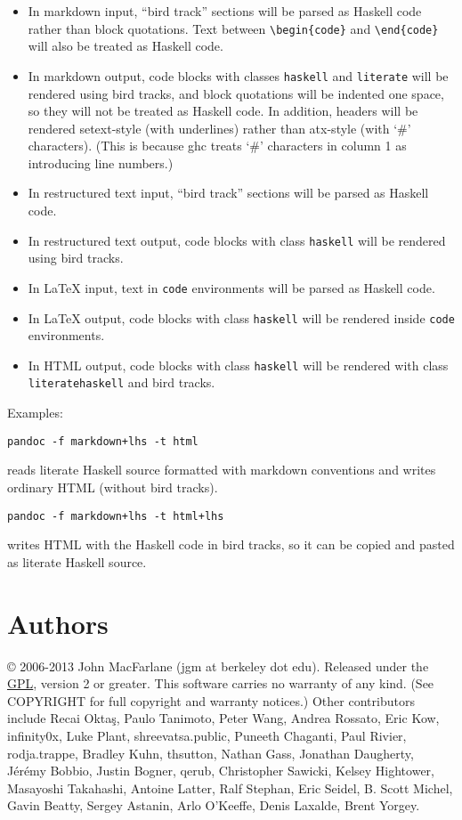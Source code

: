 \documentclass[]{article}
\begin{document}
\begin{itemize}
\item
  In markdown input, ``bird track'' sections will be parsed as Haskell
  code rather than block quotations. Text between
  \texttt{\textbackslash{}begin\{code\}} and
  \texttt{\textbackslash{}end\{code\}} will also be treated as Haskell
  code.
\item
  In markdown output, code blocks with classes \texttt{haskell} and
  \texttt{literate} will be rendered using bird tracks, and block
  quotations will be indented one space, so they will not be treated as
  Haskell code. In addition, headers will be rendered setext-style (with
  underlines) rather than atx-style (with `\#' characters). (This is
  because ghc treats `\#' characters in column 1 as introducing line
  numbers.)
\item
  In restructured text input, ``bird track'' sections will be parsed as
  Haskell code.
\item
  In restructured text output, code blocks with class \texttt{haskell}
  will be rendered using bird tracks.
\item
  In LaTeX input, text in \texttt{code} environments will be parsed as
  Haskell code.
\item
  In LaTeX output, code blocks with class \texttt{haskell} will be
  rendered inside \texttt{code} environments.
\item
  In HTML output, code blocks with class \texttt{haskell} will be
  rendered with class \texttt{literatehaskell} and bird tracks.
\end{itemize}

Examples:

\begin{verbatim}
pandoc -f markdown+lhs -t html
\end{verbatim}

reads literate Haskell source formatted with markdown conventions and
writes ordinary HTML (without bird tracks).

\begin{verbatim}
pandoc -f markdown+lhs -t html+lhs
\end{verbatim}

writes HTML with the Haskell code in bird tracks, so it can be copied
and pasted as literate Haskell source.

\section{Authors}

© 2006-2013 John MacFarlane (jgm at berkeley dot edu). Released under
the \href{http://www.gnu.org/copyleft/gpl.html}{GPL}, version 2 or
greater. This software carries no warranty of any kind. (See COPYRIGHT
for full copyright and warranty notices.) Other contributors include
Recai Oktaş, Paulo Tanimoto, Peter Wang, Andrea Rossato, Eric Kow,
infinity0x, Luke Plant, shreevatsa.public, Puneeth Chaganti, Paul
Rivier, rodja.trappe, Bradley Kuhn, thsutton, Nathan Gass, Jonathan
Daugherty, Jérémy Bobbio, Justin Bogner, qerub, Christopher Sawicki,
Kelsey Hightower, Masayoshi Takahashi, Antoine Latter, Ralf Stephan,
Eric Seidel, B. Scott Michel, Gavin Beatty, Sergey Astanin, Arlo
O'Keeffe, Denis Laxalde, Brent Yorgey.
\end{document}
